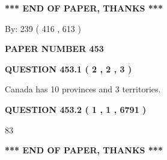 \documentclass[12pt]{article}
\begin{document}
   
   
   
   
\vspace{1.0in} 
{\textbf{\large{ *** END OF PAPER, THANKS *** }}} 
   
   
\hspace{1.0in} By: 
 239 ( 416 ,  613 )
   
   
   
   
\newpage 
\setcounter{page}{ 
   453001 } 
   
   
   
   
 {\textbf{ \Large{ PAPER NUMBER  453  }}}
   
   
\vspace{0.2in}
   
   
   
   
   
   
 \vspace{0.2in}
 
 
 
 
   
   
  
\vspace{0.2in}
  
{\textbf{\Large{QUESTION
453.1 
 ( 2 , 2 , 3 )
}}}
  
  
 
 
\noindent{}
 
 
Canada has 10  provinces and 3 territories.
 
 
 
 
  
\vspace{0.2in}
  
{\textbf{\Large{QUESTION
453.2 
 ( 1 , 1 , 6791 )
}}}
  
  
 
 
\noindent{}

83
 
 
   
   
 \vspace{0.2in}
 
   
   
   
   
\vspace{1.0in} 
{\textbf{\large{ *** END OF PAPER, THANKS *** }}} 
   
\end{document}
